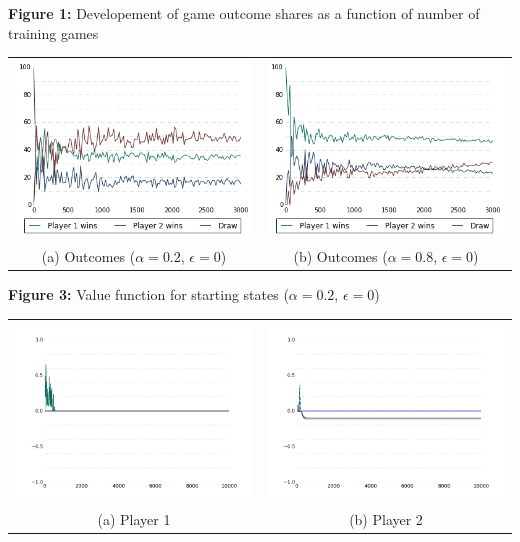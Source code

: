 \documentclass[fleqn]{article}
\begin{document}
\textbf{Figure 1:} Developement of game outcome shares as a function of number of training games
\begin{center}
	\begin{tabular}{cc}
		\includegraphics[width=70mm]{alpha02.png} &   \includegraphics[width=70mm]{alpha08.png} \\
		(a) Outcomes ($\alpha=0.2$, $\epsilon=0$)   & (b) Outcomes ($\alpha=0.8$, $\epsilon=0$)   \\[4pt]
	\end{tabular}
\end{center}

\textbf{Figure 3:} Value function for starting states ($\alpha=0.2$, $\epsilon = 0$)
\begin{center}
	\begin{tabular}{cc}
		\includegraphics[width=70mm]{player1_0200.png} &   \includegraphics[width=70mm]{player2_0200.png} \\
		(a) Player 1   & (b) Player 2    \\[4pt]
	\end{tabular}
\end{center}
\end{document}

